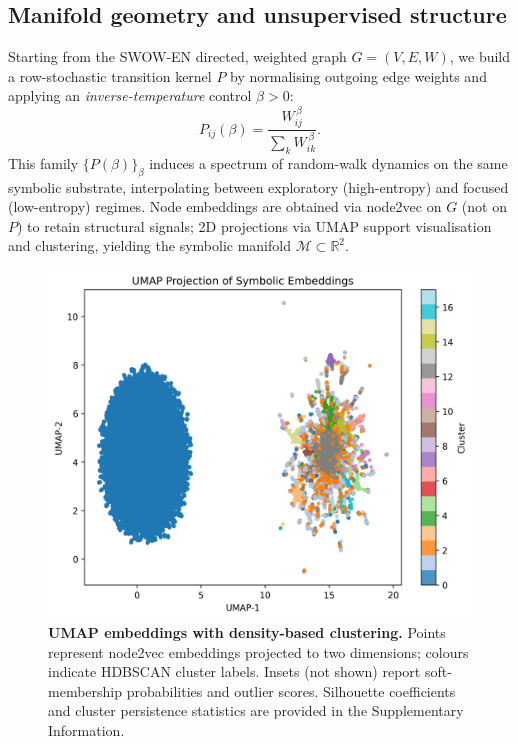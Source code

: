 \documentclass[fleqn,10pt]{wlscirep}
\begin{document}
\subsection*{Manifold geometry and unsupervised structure}
Starting from the SWOW-EN directed, weighted graph $G=(V,E,W)$, we build a row-stochastic transition kernel $P$ by normalising outgoing edge weights and applying an \textit{inverse-temperature} control $\beta>0$:
\begin{equation}
P_{ij}(\beta)=\frac{W_{ij}^{\,\beta}}{\sum_{k} W_{ik}^{\,\beta}}.
\end{equation}
This family $\{P(\beta)\}_{\beta}$ induces a spectrum of random-walk dynamics on the same symbolic substrate, interpolating between exploratory (high-entropy) and focused (low-entropy) regimes. Node embeddings are obtained via node2vec on $G$ (not on $P$) to retain structural signals; 2D projections via UMAP support visualisation and clustering, yielding the symbolic manifold $\mathcal{M}\subset\mathbb{R}^2$.

\begin{figure}[htbp]\centering
\includegraphics[width=\linewidth]{umap_projection.png}
\caption{\textbf{UMAP embeddings with density-based clustering.} Points represent node2vec embeddings projected to two dimensions; colours indicate HDBSCAN cluster labels. Insets (not shown) report soft-membership probabilities and outlier scores. Silhouette coefficients and cluster persistence statistics are provided in the Supplementary Information.}
\label{fig:umap}
\end{figure}
\end{document}
